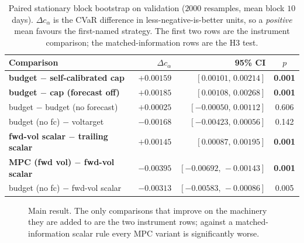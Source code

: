 \documentclass[journal]{IEEEtran}
\newcommand{\ours}[1]{\textcolor{blue!70!black}{\textbf{#1}}}
\begin{document}
\begin{table}[!t]
  \centering
  \caption{Paired stationary block bootstrap on validation ($2000$ resamples,
  mean block $10$ days). $\Delta c_\alpha$ is the CVaR difference in
  less-negative-is-better units, so a \emph{positive} mean favours the
  first-named strategy. The first two rows are the instrument comparison; the
  matched-information rows are the H3 test.}
  \label{tab:bootstrap}
  \begin{tabular}{L{5.6cm}rrc}
    \toprule
    Comparison & $\Delta c_\alpha$ & 95\% CI & $p$ \\
    \midrule
    \ours{budget $-$ self-calibrated cap} & $+0.00159$ & $[0.00101,\,0.00214]$ & \ours{0.001} \\
    \ours{budget $-$ cap (forecast off)}  & $+0.00185$ & $[0.00108,\,0.00268]$ & \ours{0.001} \\
    \midrule
    budget $-$ budget (no forecast)      & $+0.00025$ & $[-0.00050,\,0.00112]$ & 0.606 \\
    budget (no fc) $-$ voltarget         & $-0.00168$ & $[-0.00423,\,0.00056]$ & 0.142 \\
    \midrule
    \ours{fwd-vol scalar $-$ trailing scalar} & $+0.00145$ & $[0.00087,\,0.00195]$ & \ours{0.001} \\
    \ours{MPC (fwd vol) $-$ fwd-vol scalar}  & $-0.00395$ & $[-0.00692,\,-0.00143]$ & \ours{0.001} \\
    budget (no fc) $-$ fwd-vol scalar   & $-0.00313$ & $[-0.00583,\,-0.00086]$ & 0.005 \\
    \bottomrule
  \end{tabular}
\end{table}

\begin{figure}[!t]
  \centering
  \caption{Main result. The only comparisons that improve on the machinery they
  are added to are the two instrument rows; against a matched-information scalar
  rule every MPC variant is significantly worse.}
  \label{fig:main}
\end{figure}
\end{document}
